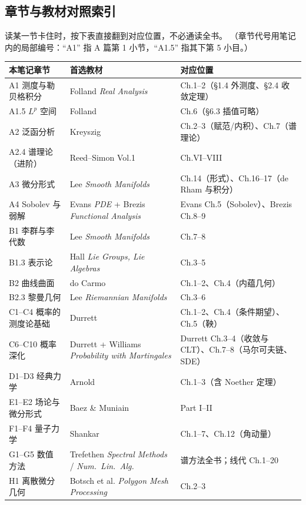 \clearpage
\subsection{章节与教材对照索引}

读某一节卡住时，按下表直接翻到对应位置，不必通读全书。
（章节代号用笔记内的局部编号：“A1” 指 A 篇第 1 小节，“A1.5” 指其下第 5 小目。）

\begin{center}
\begin{tabular}{L{3.9cm}L{5.2cm}L{5.5cm}}
\toprule
\textbf{本笔记章节} & \textbf{首选教材} & \textbf{对应位置} \\
\midrule
A1 测度与勒贝格积分 & Folland \emph{Real Analysis} & Ch.1--2（\S1.4 外测度、\S2.4 收敛定理） \\
A1.5 $L^p$ 空间 & Folland & Ch.6（\S6.3 插值可略） \\
A2 泛函分析 & Kreyszig & Ch.2--3（赋范/内积）、Ch.7（谱理论） \\
A2.4 谱理论（进阶） & Reed--Simon Vol.1 & Ch.VI--VIII \\
A3 微分形式 & Lee \emph{Smooth Manifolds} & Ch.14（形式）、Ch.16--17（de Rham 与积分） \\
A4 Sobolev 与弱解 & Evans \emph{PDE} + Brezis \emph{Functional Analysis} & Evans Ch.5（Sobolev）、Brezis Ch.8--9 \\
B1 李群与李代数 & Lee \emph{Smooth Manifolds} & Ch.7--8 \\
B1.3 表示论 & Hall \emph{Lie Groups, Lie Algebras} & Ch.3--5 \\
B2 曲线曲面 & do Carmo & Ch.1--2、Ch.4（内蕴几何） \\
B2.3 黎曼几何 & Lee \emph{Riemannian Manifolds} & Ch.3--6 \\
C1--C4 概率的测度论基础 & Durrett & Ch.1--2、Ch.4（条件期望）、Ch.5（鞅） \\
C6--C10 概率深化 & Durrett + Williams \emph{Probability with Martingales} & Durrett Ch.3--4（收敛与 CLT）、Ch.7--8（马尔可夫链、SDE） \\
D1--D3 经典力学 & Arnold & Ch.1--3（含 Noether 定理） \\
E1--E2 场论与微分形式 & Baez \& Muniain & Part I--II \\
F1--F4 量子力学 & Shankar & Ch.1--7、Ch.12（角动量） \\
G1--G5 数值方法 & Trefethen \emph{Spectral Methods} / \emph{Num.\ Lin.\ Alg.} & 谱方法全书；线代 Ch.1--20 \\
H1 离散微分几何 & Botsch et al. \emph{Polygon Mesh Processing} & Ch.2--3 \\

\end{tabular}
\end{center}
